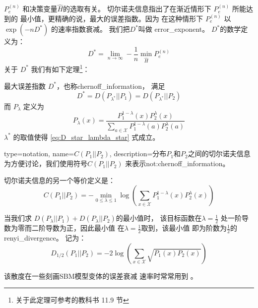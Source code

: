 $P_e^{(n)}$ 和决策变量$\widehat{H}$的选取有关。
切尔诺夫信息指出了在渐近情形下 $P_e^{(n)}$ 所能达到的
最小值，更精确的说，最大的误差指数。因为
在这种情形下 $P_e^{(n)}$ 以 $\exp(-n D^*)$ 的速率指数衰减。
我们把$D^*$叫做 \gls{error_exponent}。
$D^*$的数学定义为：
\begin{equation}
 D^* = \lim_{n\to \infty} -\frac{1}{n} \min_{\widehat{H}}
 P^{(n)}_e
\end{equation}
关于 $D^*$ 我们有如下定理\footnote{关于此定理可参考\citet{cover1999elements}的教科书
11.9 节}：
\begin{theorem}
  最大误差指数 $D^*$，也称\gls{chernoff_information}， 满足
  \begin{equation}\label{eq:D_star_lambda_star}
    D^* = D(P_{\lambda^*} || P_1) = D(P_{\lambda^*}|| P_2)
  \end{equation}
  而 $P_{\lambda}$ 定义为
  \begin{equation}\label{eq:P_lambda_x}
    P_{\lambda}(x) = \frac{P^{1-\lambda}_1 (x) P^{\lambda}_2 (x)}
    {\sum_{a \in \mathcal{X}} P^{1-\lambda}_1 (a) P^{\lambda}_2 (a)}
  \end{equation}
  $\lambda^*$ 的取值使得  \eqref{eq:D_star_lambda_star} 式成立。
\end{theorem}

{
  type=notation,
  name={$C(P_1||P_2)$},
  description={分布$P_1$和$P_2$之间的切尔诺夫信息}
}
为方便讨论，我们使用符号$C(P_1||P_2)$
来表示\glsdesc{not:chernoff_information}。

切尔诺夫信息的另一个等价定义是：
\begin{equation}\label{eq:C_P_1_P_2_another}
  C(P_1||P_2) = -\min_{0\leq \lambda \leq 1}
  \log \left(\sum_{x \in \mathcal{X}}
  P^{1-\lambda}_1(x)P^{\lambda}_2(x)
  \right)
\end{equation}

当我们求 $D(P_{\lambda} || P_1)
+ D(P_{\lambda} || P_2)$的最小值时，
该目标函数在$\lambda=\frac{1}{2}$
处一阶导数为零而二阶导数为正，因此最小值
在$\lambda=\frac{1}{2}$取到，该最小值
即为阶数为$\frac{1}{2}$的 \gls{renyi_divergence}。
记为：
\begin{equation}\label{eq:renyi_divergence}
  D_{1/2}(P_1 || P_2) =
  -2\log \left(\sum_{x \in \mathcal{X}}
  \sqrt{P_1(x)P_2(x)} \right)
\end{equation}

该散度在一些刻画SBM模型变体的误差衰减
速率时常常用到 \cite{zhang2016}。


